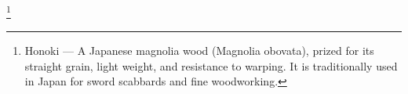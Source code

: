 \footnote{Honoki — A Japanese magnolia wood (Magnolia obovata), prized for its straight grain, light weight, and resistance to warping. It is traditionally used in Japan for sword scabbards and fine woodworking.}